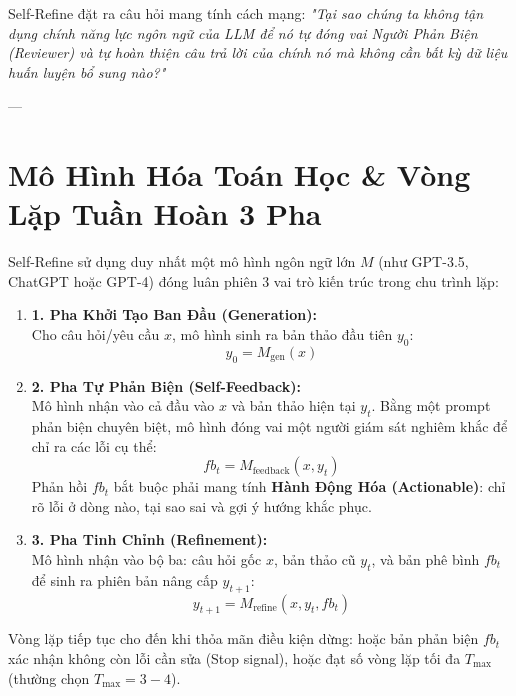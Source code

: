 \documentclass[11pt,a4paper]{article}
\begin{document}
\begin{coreconceptbox}
Self-Refine đặt ra câu hỏi mang tính cách mạng: \textit{"Tại sao chúng ta không tận dụng chính năng lực ngôn ngữ của LLM để nó tự đóng vai Người Phản Biện (Reviewer) và tự hoàn thiện câu trả lời của chính nó mà không cần bất kỳ dữ liệu huấn luyện bổ sung nào?"}
\end{coreconceptbox}

---

\section{Mô Hình Hóa Toán Học \& Vòng Lặp Tuần Hoàn 3 Pha}

Self-Refine sử dụng duy nhất một mô hình ngôn ngữ lớn $M$ (như GPT-3.5, ChatGPT hoặc GPT-4) đóng luân phiên 3 vai trò kiến trúc trong chu trình lặp:

\begin{formulationbox}
\begin{enumerate}[leftmargin=1.5em]
    \item \textbf{1. Pha Khởi Tạo Ban Đầu (Generation):}\\
    Cho câu hỏi/yêu cầu $x$, mô hình sinh ra bản thảo đầu tiên $y_0$:
    \begin{equation}
        y_0 = M_{\text{gen}}(x)
    \end{equation}

    \item \textbf{2. Pha Tự Phản Biện (Self-Feedback):}\\
    Mô hình nhận vào cả đầu vào $x$ và bản thảo hiện tại $y_t$. Bằng một prompt phản biện chuyên biệt, mô hình đóng vai một người giám sát nghiêm khắc để chỉ ra các lỗi cụ thể:
    \begin{equation}
        fb_t = M_{\text{feedback}}(x, y_t)
    \end{equation}
    Phản hồi $fb_t$ bắt buộc phải mang tính \textbf{Hành Động Hóa (Actionable)}: chỉ rõ lỗi ở dòng nào, tại sao sai và gợi ý hướng khắc phục.

    \item \textbf{3. Pha Tinh Chỉnh (Refinement):}\\
    Mô hình nhận vào bộ ba: câu hỏi gốc $x$, bản thảo cũ $y_t$, và bản phê bình $fb_t$ để sinh ra phiên bản nâng cấp $y_{t+1}$:
    \begin{equation}
        y_{t+1} = M_{\text{refine}}(x, y_t, fb_t)
    \end{equation}
\end{enumerate}
Vòng lặp tiếp tục cho đến khi thỏa mãn điều kiện dừng: hoặc bản phản biện $fb_t$ xác nhận không còn lỗi cần sửa (Stop signal), hoặc đạt số vòng lặp tối đa $T_{\max}$ (thường chọn $T_{\max} = 3-4$).
\end{formulationbox}
\end{document}
